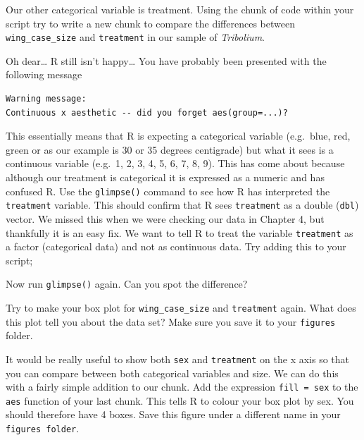 \documentclass[
]{book}
\newenvironment{Shaded}{\begin{snugshade}}{\end{snugshade}}
\newcommand{\CommentTok}[1]{\textcolor[rgb]{0.56,0.35,0.01}{\textit{#1}}}
\newcommand{\FunctionTok}[1]{\textcolor[rgb]{0.13,0.29,0.53}{\textbf{#1}}}
\newcommand{\NormalTok}[1]{#1}
\newcommand{\OtherTok}[1]{\textcolor[rgb]{0.56,0.35,0.01}{#1}}
\newcommand{\SpecialCharTok}[1]{\textcolor[rgb]{0.81,0.36,0.00}{\textbf{#1}}}
\begin{document}
Our other categorical variable is treatment. Using the chunk of code within your script try to write a new chunk to compare the differences between \texttt{wing\_case\_size} and \texttt{treatment} in our sample of \emph{Tribolium}.

Oh dear\ldots{} R still isn't happy\ldots{} You have probably been presented with the following message

\begin{verbatim}
Warning message:
Continuous x aesthetic -- did you forget aes(group=...)? 
\end{verbatim}

This essentially means that R is expecting a categorical variable (e.g.~blue, red, green or as our example is 30 or 35 degrees centigrade) but what it sees is a continuous variable (e.g.~1, 2, 3, 4, 5, 6, 7, 8, 9). This has come about because although our treatment is categorical it is expressed as a numeric and has confused R. Use the \texttt{glimpse()} command to see how R has interpreted the \texttt{treatment} variable. This should confirm that R sees \texttt{treatment} as a double (\texttt{dbl}) vector. We missed this when we were checking our data in Chapter 4, but thankfully it is an easy fix. We want to tell R to treat the variable \texttt{treatment} as a factor (categorical data) and not as continuous data. Try adding this to your script;

\begin{Shaded}
\end{Shaded}

Now run \texttt{glimpse()} again. Can you spot the difference?

Try to make your box plot for \texttt{wing\_case\_size} and \texttt{treatment} again. What does this plot tell you about the data set? Make sure you save it to your \texttt{figures} folder.

It would be really useful to show both \texttt{sex} and \texttt{treatment} on the x axis so that you can compare between both categorical variables and size. We can do this with a fairly simple addition to our chunk. Add the expression \texttt{fill\ =\ sex} to the \texttt{aes} function of your last chunk. This tells R to colour your box plot by sex. You should therefore have 4 boxes. Save this figure under a different name in your \texttt{figures\ folder}.
\end{document}
